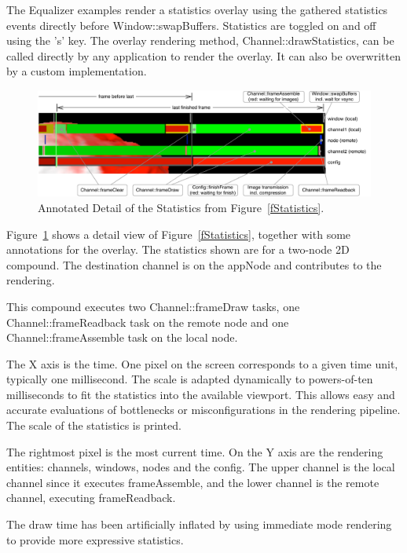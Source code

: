 \documentclass[10pt,a4]{scrartcl}
\newcommand{\fig}[1]{Figure~\ref{#1}}
\begin{document}
The Equalizer examples render a statistics overlay using the gathered
statistics events directly before
\textsf{Window::swapBuffers}. Statistics are toggled on and off using
the 's' key. The overlay rendering method,
\textsf{Channel::drawStatistics}, can be called directly by any
application to render the overlay. It can also be overwritten by a
custom implementation.

\begin{figure}[h!t]
  \includegraphics[width=\textwidth]{images/statisticsDetail.pdf}
    {\caption{\small\label{fStatisticsDetail}Annotated Detail of the
        Statistics from \fig{fStatistics}.}}
\end{figure}

\fig{fStatisticsDetail} shows a detail view of \fig{fStatistics},
together with some annotations for the overlay. The statistics shown are
for a two-node 2D compound. The destination channel is on the
\textsf{appNode} and contributes to the rendering.

This compound executes two \textsf{Channel::frameDraw} tasks, one
\textsf{Channel::frame\-Read\-back} task on the remote node and one
\textsf{Channel::frameAssemble} task on the local node.

The X axis is the time. One pixel on the screen corresponds to a given
time unit, typically one millisecond. The scale is adapted dynamically
to powers-of-ten milliseconds to fit the statistics into the available
viewport. This allows easy and accurate evaluations of bottlenecks or
misconfigurations in the rendering pipeline. The scale of the statistics
is printed.

The rightmost pixel is the most current time. On the Y axis are the
rendering entities: channels, windows, nodes and the config. The upper
channel is the local channel since it executes \textsf{frameAssemble},
and the lower channel is the remote channel, executing {frameReadback}.

The draw time has been artificially inflated by using immediate mode
rendering to provide more expressive statistics.
\end{document}

